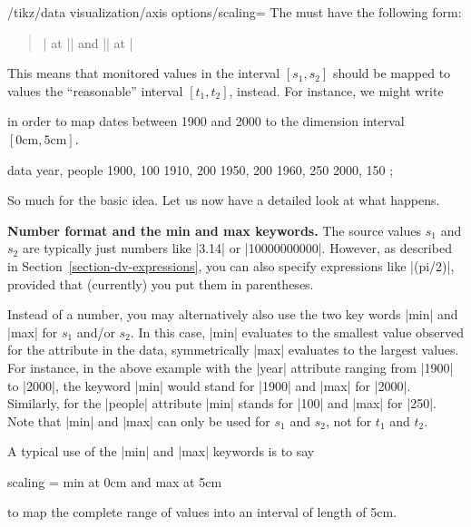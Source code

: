 \begin{key}{/tikz/data visualization/axis options/scaling=}
    The  must have the following form:
    \begin{quote}
        | at || and || at |
    \end{quote}
    This means that monitored values in the interval $[s_1,s_2]$ should be
    mapped to values the ``reasonable'' interval $[t_1,t_2]$, instead. For
    instance, we might write
\begin{codeexample}
\end{codeexample}
    in order to map dates between 1900 and 2000 to the dimension interval
    $[0\mathrm{cm},5\mathrm{cm}]$.
\begin{codeexample}[preamble={\usetikzlibrary{datavisualization}}]
\tikz \datavisualization
   [scientific axes,
    x axis={attribute=people, length=2.5cm, ticks=few},
    y axis={attribute=year, scaling=1900 at 0cm and 2000 at 5cm},
    visualize as scatter]
  data {
    year, people
    1900, 100
    1910, 200
    1950, 200
    1960, 250
    2000, 150
  };
\end{codeexample}
    So much for the basic idea. Let us now have a detailed look at what
    happens.


    \medskip
    \textbf{Number format and the min and max keywords.}
    The source values $s_1$ and $s_2$ are typically just numbers like |3.14| or
    |10000000000|. However, as described in
    Section~\ref{section-dv-expressions}, you can also specify expressions like
    |(pi/2)|, provided that (currently) you put them in parentheses.

    Instead of a number, you may alternatively also use the two key words |min|
    and |max| for $s_1$ and/or $s_2$. In this case, |min| evaluates to the
    smallest value observed for the attribute in the data, symmetrically |max|
    evaluates to the largest values. For instance, in the above example with
    the |year| attribute ranging from |1900| to |2000|, the keyword |min| would
    stand for |1900| and |max| for |2000|. Similarly, for the |people|
    attribute |min| stands for |100| and |max| for |250|. Note that |min| and
    |max| can only be used for $s_1$ and $s_2$, not for $t_1$ and $t_2$.

    A typical use of the |min| and |max| keywords is to say
\begin{codeexample}
scaling = min at 0cm and max at 5cm
\end{codeexample}
    to map the complete range of values into an interval of length of 5cm.


\end{key}
